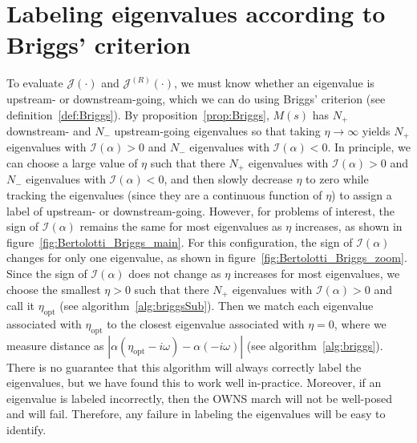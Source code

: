 \section{Labeling eigenvalues according to Briggs' criterion}\label{app:Briggs}

To evaluate $\mathcal{J}(\cdot)$ and $\mathcal{J}^{(R)}(\cdot)$, we must know whether an eigenvalue is upstream- or downstream-going, which we can do using Briggs' criterion (see definition~\ref{def:Briggs}). By proposition~\ref{prop:Briggs}, $M(s)$ has $N_+$ downstream- and $N_-$ upstream-going eigenvalues so that taking $\eta\to\infty$ yields $N_+$ eigenvalues with $\mathcal{I}(\alpha)>0$ and $N_-$ eigenvalues with $\mathcal{I}(\alpha)<0$. In principle, we can choose a large value of $\eta$ such that there $N_+$ eigenvalues with $\mathcal{I}(\alpha)>0$ and $N_-$ eigenvalues with $\mathcal{I}(\alpha)<0$, and then slowly decrease $\eta$ to zero while tracking the eigenvalues (since they are a continuous function of $\eta$) to assign a label of upstream- or downstream-going. However, for problems of interest, the sign of $\mathcal{I}(\alpha)$ remains the same for most eigenvalues as $\eta$ increases, as shown in figure~\ref{fig:Bertolotti_Briggs_main}. For this configuration, the sign of $\mathcal{I}(\alpha)$ changes for only one eigenvalue, as shown in figure~\ref{fig:Bertolotti_Briggs_zoom}. Since the sign of $\mathcal{I}(\alpha)$ does not change as $\eta$ increases for most eigenvalues, we choose the smallest $\eta>0$ such that there $N_+$ eigenvalues with $\mathcal{I}(\alpha)>0$ and call it $\eta_{\mathrm{opt}}$ (see algorithm~\ref{alg:briggsSub}). Then we match each eigenvalue associated with $\eta_{\mathrm{opt}}$ to the closest eigenvalue associated with $\eta=0$, where we measure distance as $|\alpha(\eta_{\mathrm{opt}}-i\omega)-\alpha(-i\omega)|$ (see algorithm~\ref{alg:briggs}). There is no guarantee that this algorithm will always correctly label the eigenvalues, but we have found this to work well in-practice. Moreover, if an eigenvalue is labeled incorrectly, then the OWNS march will not be well-posed and will fail. Therefore, any failure in labeling the eigenvalues will be easy to identify.


